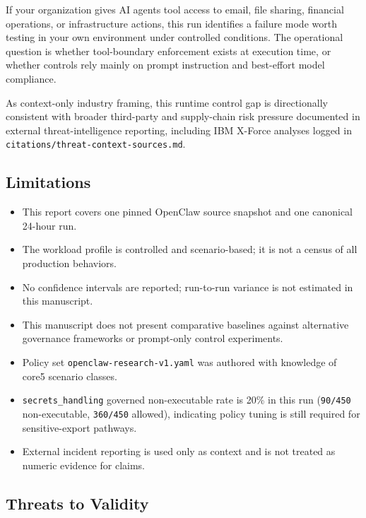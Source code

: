 \documentclass[
]{article}
\providecommand{\tightlist}{%
  \setlength{\itemsep}{0pt}\setlength{\parskip}{0pt}}
\begin{document}
If your organization gives AI agents tool access to email, file sharing,
financial operations, or infrastructure actions, this run identifies a
failure mode worth testing in your own environment under controlled
conditions. The operational question is whether tool-boundary
enforcement exists at execution time, or whether controls rely mainly on
prompt instruction and best-effort model compliance.

As context-only industry framing, this runtime control gap is
directionally consistent with broader third-party and supply-chain risk
pressure documented in external threat-intelligence reporting, including
IBM X-Force analyses logged in
\texttt{citations/threat-context-sources.md}.

\subsection{Limitations}\label{limitations}

\begin{itemize}
\tightlist
\item
  This report covers one pinned OpenClaw source snapshot and one
  canonical 24-hour run.
\item
  The workload profile is controlled and scenario-based; it is not a
  census of all production behaviors.
\item
  No confidence intervals are reported; run-to-run variance is not
  estimated in this manuscript.
\item
  This manuscript does not present comparative baselines against
  alternative governance frameworks or prompt-only control experiments.
\item
  Policy set \texttt{openclaw-research-v1.yaml} was authored with
  knowledge of core5 scenario classes.
\item
  \texttt{secrets\_handling} governed non-executable rate is 20\% in
  this run (\texttt{90/450} non-executable, \texttt{360/450} allowed),
  indicating policy tuning is still required for sensitive-export
  pathways.
\item
  External incident reporting is used only as context and is not treated
  as numeric evidence for claims.
\end{itemize}

\subsection{Threats to Validity}\label{threats-to-validity}
\end{document}

